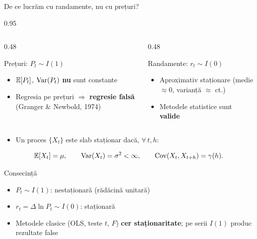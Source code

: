 \documentclass[9pt, aspectratio=169, t]{beamer}
\begin{document}
\begin{frame}[shrink=10]{De ce lucrăm cu randamente, nu cu prețuri?}
    \begin{cminipage}{0.95\textwidth}
    \begin{columns}[T]
    \begin{column}{0.48\textwidth}
    \begin{alertblock}{Prețuri: $P_t \sim I(1)$}
    \begin{itemize}\setlength{\itemsep}{0pt}
        \item $\mathbb{E}[P_t]$, $\text{Var}(P_t)$ \textbf{nu} sunt constante
        \item Regresia pe prețuri $\Rightarrow$ \textbf{regresie falsă} (Granger \& Newbold, 1974)
    \end{itemize}
    \end{alertblock}
    \end{column}
    \begin{column}{0.48\textwidth}
    \begin{exampleblock}{Randamente: $r_t \sim I(0)$}
    \begin{itemize}\setlength{\itemsep}{0pt}
        \item Aproximativ staționare (medie $\approx 0$, varianță $\approx$ ct.)
        \item Metodele statistice sunt \textbf{valide}
    \end{itemize}
    \end{exampleblock}
    \end{column}
    \end{columns}
    \vspace{0.1cm}
    \begin{defn}
    \begin{itemize}\setlength{\itemsep}{0pt}
        \item Un proces $\{X_t\}$ este slab staționar dacă, $\forall\, t, h$:
    \end{itemize}
    \[
    \mathbb{E}[X_t] = \mu, \qquad \text{Var}(X_t) = \sigma^2 < \infty, \qquad \text{Cov}(X_t, X_{t+h}) = \gamma(h).
    \]
    \end{defn}
    \vspace{0.1cm}
    \begin{block}{Consecință}
    \begin{itemize}\setlength{\itemsep}{0pt}
        \item $P_t \sim I(1)$: nestaționară (rădăcină unitară)
        \item $r_t = \Delta \ln P_t \sim I(0)$: staționară
        \item Metodele clasice (OLS, teste $t$, $F$) \textbf{cer staționaritate}; pe serii $I(1)$ produc rezultate false
    \end{itemize}
    \end{block}
    \end{cminipage}
\end{frame}
\end{document}
